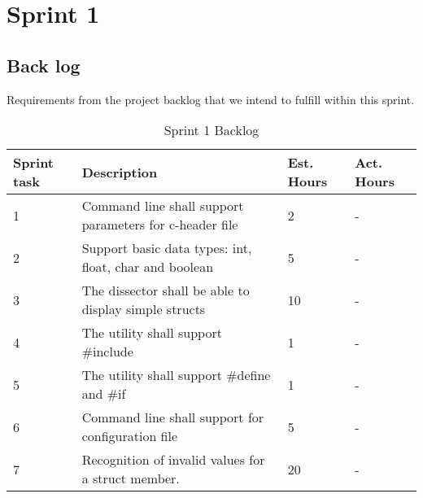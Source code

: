 \chapter{Sprint 1}

\section{Back log}
Requirements from the project backlog that we intend to fulfill within this sprint.

\begin{table}[ht] \center
\caption{Sprint 1 Backlog}
\begin{tabular}{p{1cm} p{6cm} p{1cm} p{1cm}}
	Sprint task & Description & Est. Hours & Act. Hours \\
	\hline
	1 & Command line shall support parameters for c-header file & 2 & -\\
	2 & Support basic data types: int, float, char and boolean & 5 & -\\	
	3 & The dissector shall be able to display simple structs & 10 & -\\
	4 & The utility shall support \#include & 1 & -\\
	5 & The utility shall support \#define and \#if & 1 & -\\	
	6 & Command line shall support for configuration file & 5 & -\\
	7 & Recognition of invalid values for a struct member. & 20 & -\\
\end{tabular}
\end{table}

